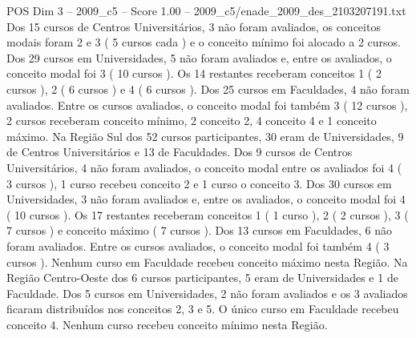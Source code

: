 \begin{textsample}{POS Dim 3 – 2009\_c5 – Score 1.00 – 2009\_c5/enade\_2009\_des\_2103207191.txt}
Dos 15 cursos de Centros Universitários, 3 não foram avaliados, os conceitos modais foram 2 e 3 ( 5 cursos cada ) e o conceito mínimo foi alocado a 2 cursos.
Dos 29 cursos em Universidades, 5 não foram avaliados e, entre os avaliados, o conceito modal foi 3 ( 10 cursos ).
Os 14 restantes receberam conceitos 1 ( 2 cursos ), 2 ( 6 cursos ) e 4 ( 6 cursos ).
Dos 25 cursos em Faculdades, 4 não foram avaliados.
Entre os cursos avaliados, o conceito modal foi também 3 ( 12 cursos ), 2 cursos receberam conceito mínimo, 2 conceito 2, 4 conceito 4 e 1 conceito máximo.
Na Região Sul dos 52 cursos participantes, 30 eram de Universidades, 9 de Centros Universitários e 13 de Faculdades.
Dos 9 cursos de Centros Universitários, 4 não foram avaliados, o conceito modal entre os avaliados foi 4 ( 3 cursos ), 1 curso recebeu conceito 2 e 1 curso o conceito 3.
Dos 30 cursos em Universidades, 3 não foram avaliados e, entre os avaliados, o conceito modal foi 4 ( 10 cursos ).
Os 17 restantes receberam conceitos 1 ( 1 curso ), 2 ( 2 cursos ), 3 ( 7 cursos ) e conceito máximo ( 7 cursos ).
Dos 13 cursos em Faculdades, 6 não foram avaliados.
Entre os cursos avaliados, o conceito modal foi também 4 ( 3 cursos ).
Nenhum curso em Faculdade recebeu conceito máximo nesta Região.
Na Região Centro-Oeste dos 6 cursos participantes, 5 eram de Universidades e 1 de Faculdade.
Dos 5 cursos em Universidades, 2 não foram avaliados e os 3 avaliados ficaram distribuídos nos conceitos 2, 3 e 5.
O único curso em Faculdade recebeu conceito 4.
Nenhum curso recebeu conceito mínimo nesta Região.

\end{textsample}
